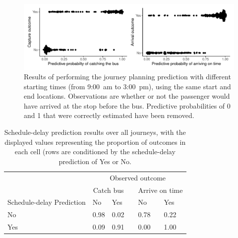 \begin{knitrout}\small
{}\color{fgcolor}\begin{figure}

{\centering \includegraphics[width=\textwidth]{figure/eta_journey_results_avg-1} 

}

\caption[Results of performing the journey planning prediction with different starting times]{Results of performing the journey planning prediction with different starting times (from  9:00~am to  3:00~pm), using the same start and end locations. Observations are whether or not the passenger would have arrived at the stop before the bus. Predictive probabilities of 0 and 1 that were correctly estimated have been removed.}\label{fig:eta_journey_results_avg}
\end{figure}

\begin{table}

\caption{\label{tab:eta_journey_results_avg}Schedule-delay prediction results over all journeys, with the displayed values representing the proportion of outcomes in each cell (rows are conditioned by the schedule-delay prediction of Yes or No. }
\centering
\fontsize{8}{10}\selectfont
\begin{tabular}[t]{llllll}
\toprule
\multicolumn{1}{c}{} & \multicolumn{5}{c}{Observed outcome} \\
\cmidrule(l{3pt}r{3pt}){2-6}
\multicolumn{1}{c}{ } & \multicolumn{2}{c}{Catch bus} & \multicolumn{1}{c}{} & \multicolumn{2}{c}{Arrive on time} \\
\cmidrule(l{3pt}r{3pt}){2-3} \cmidrule(l{3pt}r{3pt}){5-6}
Schedule-delay Prediction & No & Yes &  & No & Yes\\
\midrule
No & 0.98 & 0.02 &  & 0.78 & 0.22\\
Yes & 0.09 & 0.91 &  & 0.00 & 1.00\\
\bottomrule
\end{tabular}
\end{table}


\end{knitrout}

